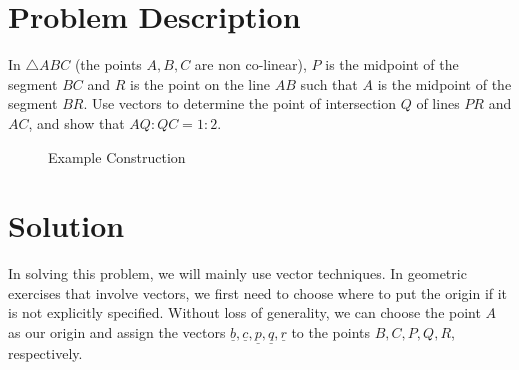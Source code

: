 \documentclass{article}
\renewcommand{\v}[1]{\underline{#1}}
\begin{document}
    
    \section{Problem Description}
    In $ \triangle ABC$ (the points $A,B,C$ are non co-linear),
    $P$ is the midpoint of the segment $BC$ and
    $R$ is the point on the line $AB$ such that $A$
    is the midpoint of the segment $BR$. Use vectors to determine the point of intersection
    $Q$ of lines $PR$ and $AC$, and show that $AQ:QC = 1:2$.

    \begin{figure}[h]
        \begin{center}
        \end{center}
        \caption{Example Construction}
    \end{figure}

    \section{Solution}
    In solving this problem, we will mainly use vector techniques.
    In geometric exercises that involve vectors, we first need to choose where to put the origin
    if it is not explicitly specified. Without loss of generality, we can choose the point $A$ as our origin and assign the vectors
    $\v{b}, \v{c}, \v{p}, \v{q}, \v{r}$ to the points $B, C, P, Q, R$, respectively. \\
\end{document}
